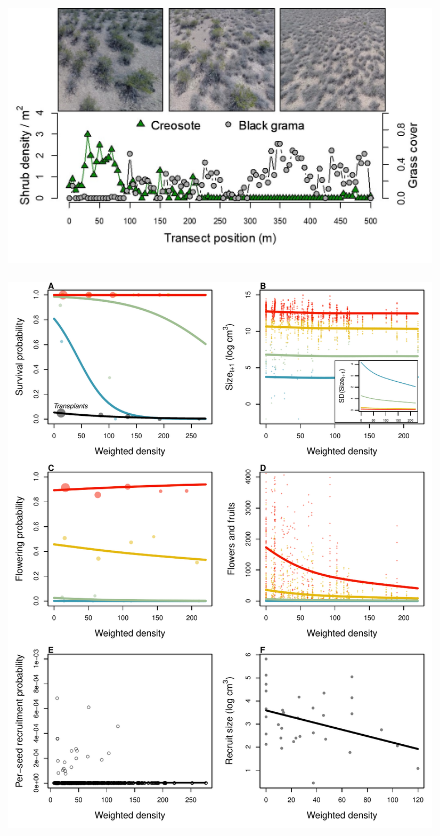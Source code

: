 \documentclass[11pt]{article}\usepackage[]{graphicx}\usepackage[]{color}
\begin{document}
\newpage
\begin{figure}[H]
  \begin{center}
    \includegraphics[width=\linewidth]{Figures/waves_pics}
    \caption{}
  \label{fig:waves}
  \end{center}
\end{figure}

\newpage
\begin{figure}[H]
  \begin{center}
    \includegraphics[width=\linewidth]{Figures/vital_rates}
  \caption{}
  \label{fig:vital_rates}
  \end{center}
\end{figure}
\end{document}
